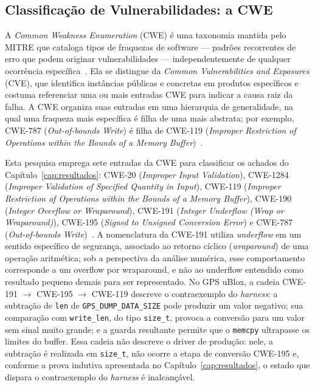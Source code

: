 \subsection{Classificação de Vulnerabilidades: a CWE}

A \textit{Common Weakness Enumeration} (CWE) é uma taxonomia mantida pelo MITRE
que cataloga tipos de fraquezas de software --- padrões recorrentes de erro que
podem originar vulnerabilidades --- independentemente de qualquer ocorrência
específica~\cite{MITRE_CWE}. Ela se distingue da \textit{Common Vulnerabilities
and Exposures} (CVE), que identifica instâncias públicas e concretas em produtos
específicos e costuma referenciar uma ou mais entradas CWE para indicar a causa
raiz da falha. A CWE organiza suas entradas em uma hierarquia de generalidade, na
qual uma fraqueza mais específica é filha de uma mais abstrata; por exemplo,
CWE-787 (\textit{Out-of-bounds Write}) é filha de CWE-119 (\textit{Improper
Restriction of Operations within the Bounds of a Memory Buffer})~\cite{MITRE_CWE}.

Esta pesquisa emprega sete entradas da CWE para classificar os achados do Capítulo~\ref{cap:resultados}: CWE-20 (\textit{Improper Input Validation}), CWE-1284 (\textit{Improper Validation of Specified Quantity in Input}), CWE-119 (\textit{Improper Restriction of Operations within the Bounds of a Memory Buffer}), CWE-190 (\textit{Integer Overflow or Wraparound}), CWE-191 (\textit{Integer Underflow (Wrap or Wraparound)}), CWE-195 (\textit{Signed to Unsigned Conversion Error}) e CWE-787 (\textit{Out-of-bounds Write})~\cite{MITRE_CWE}. A nomenclatura da CWE-191 utiliza \textit{underflow} em um sentido específico de segurança, associado ao retorno cíclico (\textit{wraparound}) de uma operação aritmética; sob a perspectiva da análise numérica, esse comportamento corresponde a um overflow por wraparound, e não ao underflow entendido como resultado pequeno demais para ser representado. No GPS uBlox, a cadeia CWE-191 $\rightarrow$ CWE-195 $\rightarrow$ CWE-119 descreve o contraexemplo do \textit{harness}: a subtração de \texttt{len} de \texttt{GPS\_DUMP\_DATA\_SIZE} pode produzir um valor negativo; sua comparação com \texttt{write\_len}, do tipo \texttt{size\_t}, provoca a conversão para um valor sem sinal muito grande; e a guarda resultante permite que o \texttt{memcpy} ultrapasse os limites do buffer. Essa cadeia não descreve o driver de produção: nele, a subtração é realizada em \texttt{size\_t}, não ocorre a etapa de conversão CWE-195 e, conforme a prova indutiva apresentada no Capítulo~\ref{cap:resultados}, o estado que dispara o contraexemplo do \textit{harness} é inalcançável.


